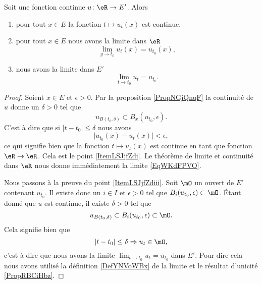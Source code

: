 \begin{proposition} \label{PropVKSNflB}
    Soit une fonction continue \( u\colon \eR\to E'\). Alors
    \begin{enumerate}
        \item   \label{ItemLSJjfZdi}
            pour tout \( x\in E\) la fonction \( t\mapsto u_t(x)\) est continue,
        \item\label{ItemLSJjfZdii}
            pour tout \( x\in E\) nous avons la limite dans \( \eR\)
            \begin{equation}    \label{EqWKdFPVO}
                \lim_{y\to t_0} u_t(x)=u_{t_0}(x),
            \end{equation}
        \item\label{ItemLSJjfZdiii}
            nous avons la limite dans \( E'\) 
            \begin{equation}
                \lim_{t\to t_0} u_t=u_{t_0}.
            \end{equation}
    \end{enumerate}
\end{proposition}

\begin{proof}
    Soient \( x\in E\) et \( \epsilon> 0\). Par la proposition \ref{PropNGjQnqF} la continuité de \( u\) donne un \( \delta>0\) tel que
    \begin{equation}
        u_{B(t_0,\delta)}\subset B_x(u_{t_0},\epsilon).
    \end{equation}
    C'est à dire que si \( | t-t_0 |\leq \delta\) nous avons
    \begin{equation}
        \big| u_{t_0}(x)-u_t(x) \big|<\epsilon,
    \end{equation}
    ce qui signifie bien que la fonction \( t\mapsto u_t(x)\) est continue en tant que fonction \( \eR\to \eR\). Cela est le point \ref{ItemLSJjfZdi}. Le théorème de limite et continuité dans \( \eR\) nous donne immédiatement la limite \eqref{EqWKdFPVO}.

    Nous passons à la preuve du point \ref{ItemLSJjfZdiii}. Soit \( \mO\) un ouvert de \( E'\) contenant \( u_{t_0}\). Il existe donc un \( i\in I\) et \( \epsilon>0\) tel que \( B_i(u_{t_0},\epsilon)\subset \mO\). Étant donné que \( u\) est continue, il existe \( \delta>0\) tel que
    \begin{equation}
        u_{B(t_0,\delta)}\subset B_i(u_{t_0},\epsilon)\subset \mO.
    \end{equation}
    Cela signifie bien que 
    \begin{equation}
        | t-t_0 |\leq \delta\Rightarrow u_t\in\mO,
    \end{equation}
    c'est à dire que nous avons la limite \( \lim_{t\to t_0} u_t=u_{t_0}\) dans \( E'\). Pour dire cela nous avons utilisé la définition \ref{DefYNVoWBx} de la limite et le résultat d'unicité \ref{PropRBCiHbz}.
\end{proof}

